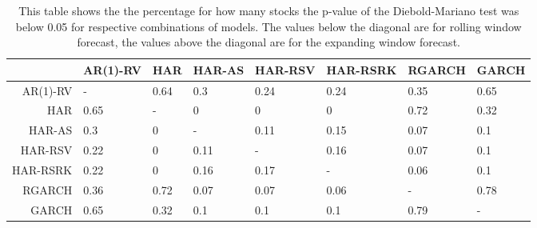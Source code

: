 \begin{table}[ht]
\centering
\begin{tabular}{rlllllll}
  \hline
 & AR(1)-RV & HAR & HAR-AS & HAR-RSV & HAR-RSRK & RGARCH & GARCH \\ 
  \hline
AR(1)-RV & - & 0.64 & 0.3 & 0.24 & 0.24 & 0.35 & 0.65 \\ 
  HAR & 0.65 & - & 0 & 0 & 0 & 0.72 & 0.32 \\ 
  HAR-AS & 0.3 & 0 & - & 0.11 & 0.15 & 0.07 & 0.1 \\ 
  HAR-RSV & 0.22 & 0 & 0.11 & - & 0.16 & 0.07 & 0.1 \\ 
  HAR-RSRK & 0.22 & 0 & 0.16 & 0.17 & - & 0.06 & 0.1 \\ 
  RGARCH & 0.36 & 0.72 & 0.07 & 0.07 & 0.06 & - & 0.78 \\ 
  GARCH & 0.65 & 0.32 & 0.1 & 0.1 & 0.1 & 0.79 & - \\ 
   \hline
\end{tabular}
\caption[DM test below 0.05]{This table shows the the percentage for how many stocks the p-value of the Diebold-Mariano test was below 0.05 for respective combinations of models.
                The values below the diagonal are for rolling window forecast, the values above the diagonal are for the expanding window forecast.} 
\label{Table:DM_test_threshold}
\end{table}
